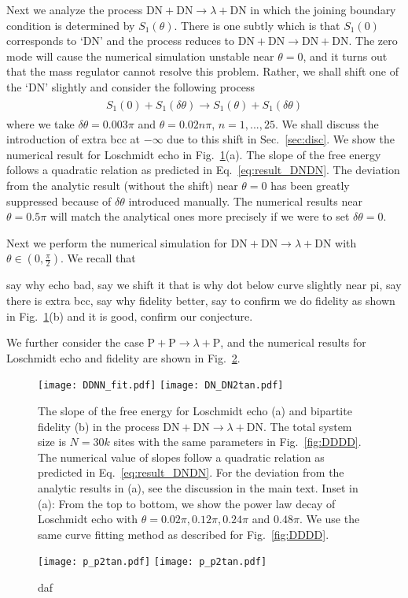 Next we analyze the process $\text{DN}+\text{DN}\rightarrow\lambda+\text{DN}$ in which the joining boundary condition is determined by $S_1(\theta)$. There is one subtly which is that $S_1(0)$ corresponds to `DN' and the process reduces to $\text{DN}+\text{DN}\rightarrow\text{DN}+\text{DN}$. The zero mode will cause the numerical simulation unstable near $\theta=0$, and it turns out that the mass regulator cannot resolve this problem. Rather, we shall shift one of the `DN' slightly and consider the following process
\begin{eqnarray}\begin{aligned}
S_1(0)+S_1(\delta\theta)\rightarrow S_1(\theta)+S_1(\delta\theta)
\end{aligned}\end{eqnarray}
where we take $\delta\theta=0.003\pi$ and $\theta=0.02n\pi$, $n=1,...,25$. We shall discuss the introduction of extra bcc at $-\infty$ due to this shift in Sec.~\ref{sec:disc}. We show the numerical result for Loschmidt echo in Fig.~\ref{fig:DDNN}(a). The slope of the free energy follows a quadratic relation as predicted in Eq.~\eqref{eq:result_DNDN}. The deviation from the analytic result (without the shift) near $\theta=0$ has been greatly suppressed because of $\delta\theta$ introduced manually. The numerical results near $\theta=0.5\pi$ will match the analytical ones more precisely if we were to set $\delta\theta=0$. 

Next we perform the numerical simulation for $\text{DN}+\text{DN}\rightarrow\lambda+\text{DN}$ with $\theta\in(0,\frac{\pi}{2})$.  We recall that  

{\color{red}say why echo bad, say we shift it that is why dot below curve slightly near pi, say there is extra bcc, say why fidelity better, say to confirm we do fidelity as shown in Fig.~\ref{fig:DDNN}(b) and it is good, confirm our conjecture. }

We further consider the case $\text{P}+\text{P}\rightarrow\lambda+\text{P}$, and the numerical results for Loschmidt echo and fidelity are shown in Fig.~\ref{fig:PPPP}. 


\begin{figure}
  \centering
\texttt{[image: DDNN\_fit.pdf]}
\texttt{[image: DN\_DN2tan.pdf]}
    \caption{The slope of the free energy for Loschmidt echo (a) and bipartite fidelity (b) in the process $\text{DN}+\text{DN}\rightarrow\lambda+\text{DN}$. The total system size is $N=30k$ sites with the same parameters in Fig.~\ref{fig:DDDD}. The numerical value of slopes follow a quadratic relation as predicted in Eq.~\eqref{eq:result_DNDN}. For the deviation from the analytic results in (a), see the discussion in the main text. Inset in (a): From the top to bottom, we show the power law decay of Loschmidt echo with $\theta=0.02\pi, 0.12\pi,0.24\pi$ and $0.48\pi$. We use the same curve fitting method as described for Fig.~\ref{fig:DDDD}.}
      \label{fig:DDNN}
\end{figure}


\begin{figure}
  \centering
  \texttt{[image: p\_p2tan.pdf]}
    \texttt{[image: p\_p2tan.pdf]}
    \caption{daf}
    \label{fig:PPPP}
\end{figure}

